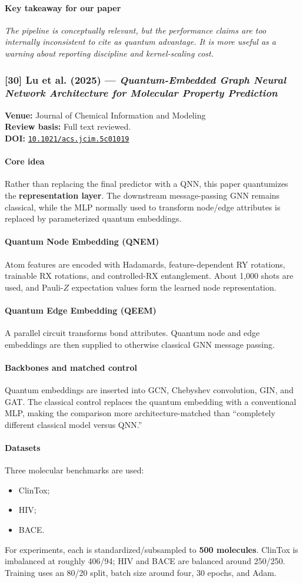 \documentclass[11pt]{article}
\newcommand{\reviewfield}[2]{\paragraph{#1}#2}
\newcommand{\keytakeaway}[1]{\paragraph{Key takeaway for our paper}\emph{#1}}
\newcommand{\paperdoi}[1]{\href{https://doi.org/#1}{\texttt{#1}}}
\begin{document}
\keytakeaway{The pipeline is conceptually relevant, but the performance claims are too internally inconsistent to cite as quantum advantage. It is more useful as a warning about reporting discipline and kernel-scaling cost.}

\subsubsection{[30] Lu et al. (2025) --- \textit{Quantum-Embedded Graph Neural Network Architecture for Molecular Property Prediction}}
\textbf{Venue:} Journal of Chemical Information and Modeling\\
\textbf{Review basis:} Full text reviewed.\\
\textbf{DOI:} \paperdoi{10.1021/acs.jcim.5c01019}

\reviewfield{Core idea}{
Rather than replacing the final predictor with a QNN, this paper quantumizes the \textbf{representation layer}. The downstream message-passing GNN remains classical, while the MLP normally used to transform node/edge attributes is replaced by parameterized quantum embeddings.
}

\reviewfield{Quantum Node Embedding (QNEM)}{
Atom features are encoded with Hadamards, feature-dependent RY rotations, trainable RX rotations, and controlled-RX entanglement. About 1,000 shots are used, and Pauli-$Z$ expectation values form the learned node representation.
}

\reviewfield{Quantum Edge Embedding (QEEM)}{
A parallel circuit transforms bond attributes. Quantum node and edge embeddings are then supplied to otherwise classical GNN message passing.
}

\reviewfield{Backbones and matched control}{
Quantum embeddings are inserted into GCN, Chebyshev convolution, GIN, and GAT. The classical control replaces the quantum embedding with a conventional MLP, making the comparison more architecture-matched than ``completely different classical model versus QNN.''
}

\reviewfield{Datasets}{
Three molecular benchmarks are used:
\begin{itemize}
    \item ClinTox;
    \item HIV;
    \item BACE.
\end{itemize}
For experiments, each is standardized/subsampled to \textbf{500 molecules}. ClinTox is imbalanced at roughly 406/94; HIV and BACE are balanced around 250/250. Training uses an 80/20 split, batch size around four, 30 epochs, and Adam.
}
\end{document}
